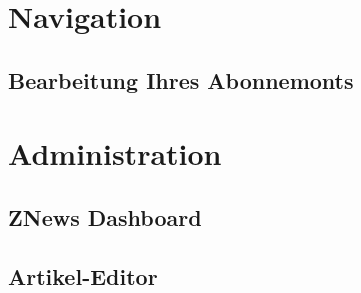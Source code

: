 

\newcommand*{\thetitle}{ZNews\\ Bedienungsanleitung}

\Begin

\section{Navigation}


\subsection{Bearbeitung Ihres Abonnemonts}


\section{Administration}

\subsection{ZNews Dashboard}


\subsection{Artikel-Editor}


\End
